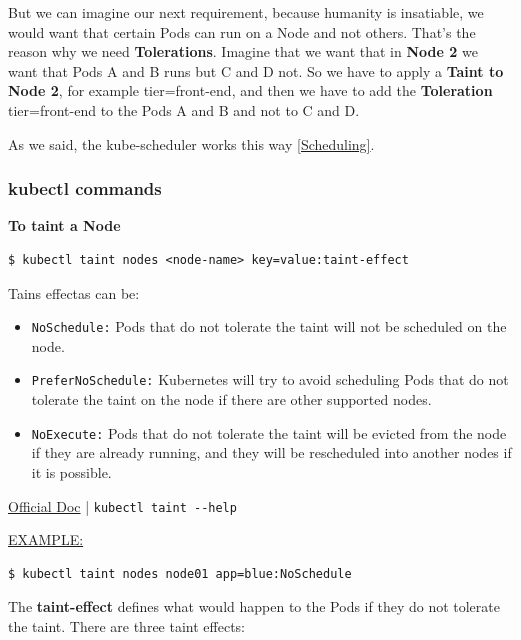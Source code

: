 \documentclass{article}
\newenvironment{codetemplate}[1][]{%
  \mybasecolorbox[#1]
  \itshape
}{%
  \endmybasecolorbox
}
\begin{document}
But we can imagine our next requirement, because humanity is insatiable, we would want that certain Pods can run on a Node and not others. That's the reason why we need \textbf{Tolerations}. Imagine that we want that in \textbf{Node 2} we want that Pods A and B runs but C and D not. So we have to apply a \textbf{Taint to Node 2}, for example tier=front-end, and then we have to add the \textbf{Toleration} tier=front-end to the Pods A and B and not to C and D.

As we said, the kube-scheduler works this way \ref{Scheduling}. 

\subsubsection{kubectl commands}

\textbf{To taint a Node}
\begin{codetemplate}{}
\begin{verbatim}
$ kubectl taint nodes <node-name> key=value:taint-effect
\end{verbatim}
\end{codetemplate}

Tains effectas can be:
\begin{itemize}
    \item \verb|NoSchedule:| Pods that do not tolerate the taint will not be scheduled on the node.
    \item \verb|PreferNoSchedule:| Kubernetes will try to avoid scheduling Pods that do not tolerate the taint on the node if there are other supported nodes.
    \item \verb|NoExecute:| Pods that do not tolerate the taint will be evicted from the node if they are already running, and they will be rescheduled into another nodes if it is possible.
\end{itemize}

\href{https://kubernetes.io/docs/concepts/scheduling-eviction/taint-and-toleration/}{Official Doc} | \verb|kubectl taint --help|

\underline{EXAMPLE:}
\begin{codetemplate}{}
\begin{verbatim}
$ kubectl taint nodes node01 app=blue:NoSchedule
\end{verbatim}
\end{codetemplate}

The \textbf{taint-effect} defines what would happen to the Pods if they do not tolerate the taint. There are three taint effects:
\end{document}
